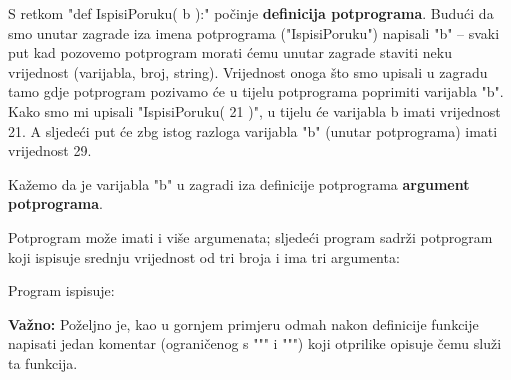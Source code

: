 S retkom "def IspisiPoruku( b ):" po\v{c}inje \textbf{definicija potprograma}.
Budu\'{c}i da smo unutar zagrade iza imena potprograma ("IspisiPoruku")
napisali "b" -- svaki put kad pozovemo potprogram morati \'{c}emu unutar
zagrade staviti neku vrijednost (varijabla, broj, string). Vrijednost onoga
\v{s}to smo upisali u zagradu tamo gdje potprogram pozivamo \'{c}e u tijelu
potprograma
poprimiti varijabla "b". Kako smo mi upisali "IspisiPoruku( 21 )", u tijelu
\'{c}e varijabla b imati vrijednost 21. A sljede\'{c}i put \'{c}e
zbg istog razloga varijabla "b" (unutar potprograma) imati vrijednost 29.

Ka\v{z}emo da je varijabla "b" u zagradi iza definicije potprograma
\textbf{argument potprograma}.

Potprogram mo\v{z}e imati i vi\v{s}e argumenata; sljede\'{c}i program
sadr\v{z}i potprogram koji ispisuje srednju vrijednost od tri broja i ima
tri argumenta:


Program ispisuje:


\textbf{Va\v{z}no:} Po\v{z}eljno je, kao u gornjem primjeru odmah nakon
definicije funkcije napisati jedan komentar (ograni\v{c}enog s """ i """)
koji otprilike opisuje \v{c}emu slu\v{z}i ta funkcija.

